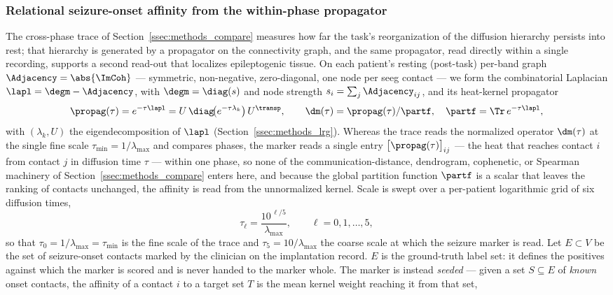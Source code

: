 \subsubsection{Relational seizure-onset affinity from the within-phase propagator}
\label{sssec:methods_epi_affinity}
The cross-phase trace of Section~\ref{ssec:methods_compare} measures how far the task's reorganization of the diffusion hierarchy persists into rest; that hierarchy is generated by a propagator on the connectivity graph, and the same propagator, read directly within a single recording, supports a second read-out that localizes epileptogenic tissue. On each patient's resting (post-task) per-band graph \(\Adjacency = \abs{\ImCoh}\) --- symmetric, non-negative, zero-diagonal, one node per \gls{seeg} contact --- we form the combinatorial Laplacian \(\lapl = \degm - \Adjacency\), with \(\degm = \diag(s)\) and node strength \(s_i = \sum_{j}\Adjacency_{ij}\), and its heat-kernel propagator
\begin{equation}
    \propag(\tau) = e^{-\tau\lapl} = U\,\diag\!\big(e^{-\tau\lambda_{k}}\big)\,U^{\transp}, \qquad \dm(\tau) = \propag(\tau)/\partf, \quad \partf = \Tr\,e^{-\tau\lapl},
    \label{eq:methods_epi_kernel}
\end{equation}
with \((\lambda_{k},U)\) the eigendecomposition of \(\lapl\) (Section~\ref{ssec:methods_lrg}). Whereas the trace reads the normalized operator \(\dm(\tau)\) at the single fine scale \(\tau_{\min}=1/\lambda_{\max}\) and compares phases, the marker reads a single entry \(\big[\propag(\tau)\big]_{ij}\) --- the heat that reaches contact \(i\) from contact \(j\) in diffusion time \(\tau\) --- within one phase, so none of the communication-distance, dendrogram, cophenetic, or Spearman machinery of Section~\ref{ssec:methods_compare} enters here, and because the global partition function \(\partf\) is a scalar that leaves the ranking of contacts unchanged, the affinity is read from the unnormalized kernel. Scale is swept over a per-patient logarithmic grid of six diffusion times,
\begin{equation}
    \tau_{\ell} = \frac{10^{\,\ell/5}}{\lambda_{\max}}, \qquad \ell = 0,1,\dots,5,
    \label{eq:methods_epi_tau}
\end{equation}
so that \(\tau_{0}=1/\lambda_{\max}=\tau_{\min}\) is the fine scale of the trace and \(\tau_{5}=10/\lambda_{\max}\) the coarse scale at which the seizure marker is read. Let \(E\subset V\) be the set of seizure-onset contacts marked by the clinician on the implantation record. \(E\) is the ground-truth label set: it defines the positives against which the marker is scored and is never handed to the marker whole. The marker is instead \emph{seeded} --- given a set \(S\subseteq E\) of \emph{known} onset contacts, the affinity of a contact \(i\) to a target set \(T\) is the mean kernel weight reaching it from that set,
